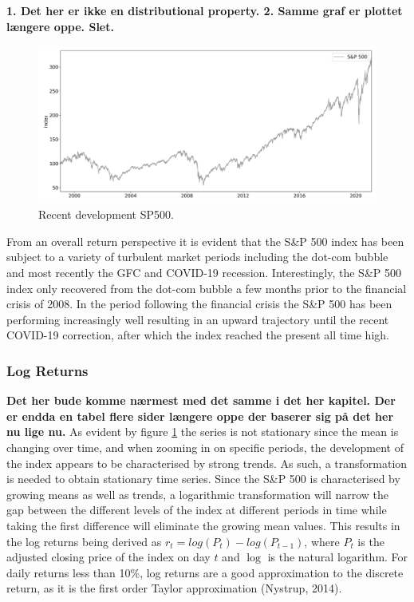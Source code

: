 \textbf{1. Det her er ikke en distributional property. 2. Samme graf er plottet længere oppe. Slet.}
\begin{figure}[H] 
    \centering
    \includegraphics[width=1.0\textwidth]{analysis/data_description/images/adjusted SP500.png}
    \caption{Recent development SP500.}
    \label{fig: all_indices_index} 
\end{figure}

From an overall return perspective it is evident that the S\&P 500 index has been subject to a variety of turbulent market periods including the dot-com bubble and most recently the GFC and COVID-19 recession. Interestingly, the S\&P 500 index only recovered from the dot-com bubble a few months prior to the financial crisis of 2008. In the period following the financial crisis the S\&P 500 has been performing increasingly well resulting in an upward trajectory until the recent COVID-19 correction, after which the index reached the present all time high. 

\subsubsection{Log Returns}
\textbf{Det her bude komme nærmest med det samme i det her kapitel. Der er endda en tabel flere sider længere oppe der baserer sig på det her nu lige nu.}
As evident by figure \ref{fig: all_indices_index} the series is not stationary since the mean is changing over time, and when zooming in on specific periods, the development of the index appears to be characterised by strong trends. As such, a transformation is needed to obtain stationary time series. Since the S\&P 500 is characterised by growing means as well as trends, a logarithmic transformation will narrow the gap between the different levels of the index at different periods in time while taking the first difference will eliminate the growing mean values. This results in the log returns being derived as $r_t = log(P_t) - log(P_{t-1})$, where $P_t$ is the adjusted closing price of the index on day $t$ and $\log$ is the natural logarithm. For daily returns less than 10\%, log returns are a good approximation to the discrete return, as it is the first order Taylor approximation (Nystrup, 2014).

